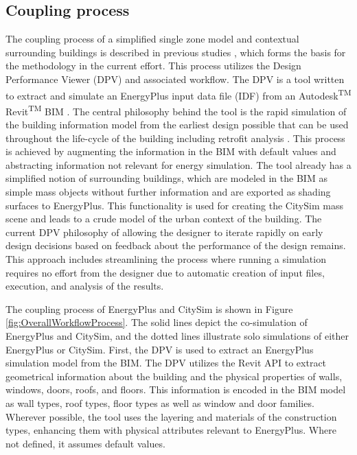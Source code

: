 \documentclass{tBPS2e}
\theoremstyle{plain}
\theoremstyle{definition}
\theoremstyle{remark}
\begin{document}
\subsection{Coupling process} 
The coupling process of a simplified single zone
model and contextual surrounding buildings is described in previous studies
\citep{thomas_multiscale_2014}, which forms the basis for the methodology
in the current effort. This process utilizes the Design Performance Viewer
(DPV) and associated workflow. The DPV is a tool written to extract and
simulate an EnergyPlus input data file (IDF) from an
Autodesk\textsuperscript{TM} Revit\textsuperscript{TM} BIM
\citep{schlueter_building_2009}. The central philosophy behind the tool is the rapid simulation
of the building information model from the earliest design possible that can be
used throughout the life-cycle of the building including retrofit analysis
\citep{miller_bim-extracted_2014}. This process is achieved by augmenting the information
in the BIM with default values and abstracting information not relevant for
energy simulation. The tool already has a simplified notion of surrounding
buildings, which are modeled in the BIM as simple mass objects without further
information and are exported as shading surfaces to EnergyPlus. This
functionality is used for creating the CitySim mass scene and leads to a crude
model of the urban context of the building. The current DPV philosophy of
allowing the designer to iterate rapidly on early design decisions based on
feedback about the performance of the design remains. This approach includes
streamlining the process where running a simulation requires no effort from
the designer due to automatic creation of input files, execution, and analysis
of the results.

The coupling process of EnergyPlus and CitySim is shown in Figure
\ref{fig:OverallWorkflowProcess}. The solid lines depict the co-simulation of EnergyPlus
and CitySim, and the dotted lines illustrate solo simulations of either EnergyPlus or CitySim. 
First, the DPV is used to extract an
EnergyPlus simulation model from the BIM. The DPV utilizes the Revit API to
extract geometrical information about the building and the physical properties
of walls, windows, doors, roofs, and floors. This information is encoded in the
BIM model as wall types, roof types, floor types as well as window and door
families. Wherever possible, the tool uses the layering and materials of the
construction types, enhancing them with physical attributes relevant to
EnergyPlus. Where not defined, it assumes default values.
\end{document}
